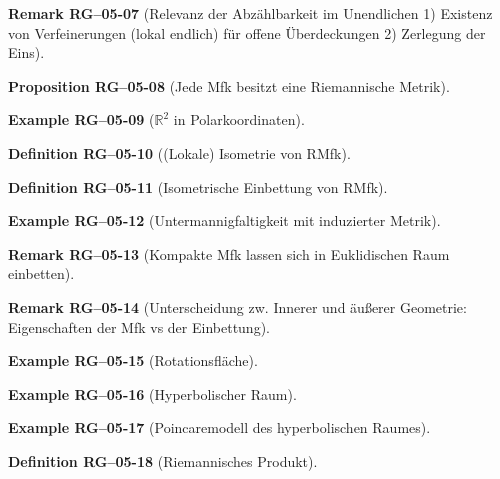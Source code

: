 \documentclass[10pt, letterpaper]{article}
\newcommand{\R}{\mathbb{R}}
\newcommand{\CustomHeading}[3]{%
  \par\medskip\noindent%
  \textbf{#1 #2} \textnormal{(#3)}.\enskip%
}
\newenvironment{DEF}[2]{\CustomHeading{Definition}{#1}{#2}}{}
\newenvironment{PROP}[2]{\CustomHeading{Proposition}{#1}{#2}}{}
\newenvironment{REM}[2]{\CustomHeading{Remark}{#1}{#2}}{}
\newenvironment{EXA}[2]{\CustomHeading{Example}{#1}{#2}}{}
\begin{document}
\begin{REM}{RG--05-07}{Relevanz der Abzählbarkeit im Unendlichen
1) Existenz von Verfeinerungen (lokal endlich) für offene Überdeckungen
2) Zerlegung der Eins}
\end{REM}

\begin{PROP}{RG--05-08}{Jede Mfk besitzt eine Riemannische Metrik}
\end{PROP}

\begin{EXA}{RG--05-09}{$\R^2$ in Polarkoordinaten}
\end{EXA}

\begin{DEF}{RG--05-10}{(Lokale) Isometrie von RMfk}
\end{DEF}

\begin{DEF}{RG--05-11}{Isometrische Einbettung von RMfk}
\end{DEF}

\begin{EXA}{RG--05-12}{Untermannigfaltigkeit mit induzierter Metrik}
\end{EXA}

\begin{REM}{RG--05-13}{Kompakte Mfk lassen sich in Euklidischen Raum einbetten}
\end{REM}

\begin{REM}{RG--05-14}{Unterscheidung zw. Innerer und äußerer Geometrie: Eigenschaften der Mfk vs der Einbettung}
\end{REM}

\begin{EXA}{RG--05-15}{Rotationsfläche}
\end{EXA}

\begin{EXA}{RG--05-16}{Hyperbolischer Raum}
\end{EXA}

\begin{EXA}{RG--05-17}{Poincaremodell des hyperbolischen Raumes}
\end{EXA}

\begin{DEF}{RG--05-18}{Riemannisches Produkt}
\end{DEF}
\end{document}
